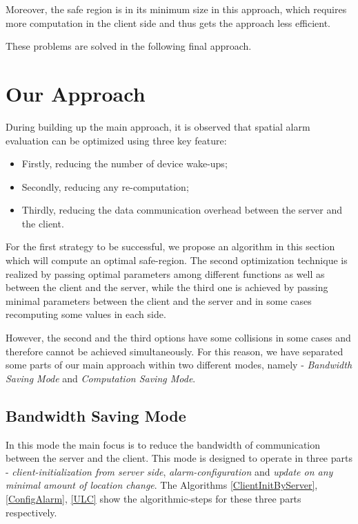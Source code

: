 \documentclass{sig-alternate}
\begin{document}
Moreover, the safe region is in its minimum size in this approach, which requires more computation in the client side and thus gets the approach less efficient.

These problems are solved in the following final approach.

\section{Our Approach}
During building up the main approach, it is observed that spatial alarm evaluation can be optimized using three key feature: 
\begin{itemize}
\setlength\itemsep{0em}
\item Firstly, reducing the number of device wake-ups;
\item Secondly, reducing any re-computation;
\item Thirdly, reducing the data communication overhead between the server and the client.
\end{itemize}

For the first strategy to be successful, we propose an algorithm in this section which will compute an optimal safe-region. The second optimization technique is realized by passing optimal parameters among different functions as well as between the client and the server, while the third one is achieved by passing minimal parameters between the client and the server and in some cases recomputing some values in each side.

However, the second and the third options have some collisions in some cases and therefore cannot be achieved simultaneously. For this reason, we have separated some parts of our main approach within two different modes, namely - \textit{Bandwidth Saving Mode} and \textit{Computation Saving Mode}.

\subsection{Bandwidth Saving Mode}
In this mode the main focus is to reduce the bandwidth of communication between the server and the client. This mode is designed to operate in three parts - \textit{client-initialization from server side}, \textit{alarm-configuration} and \textit{update on any minimal amount of location change}. The Algorithms \ref{ClientInitByServer}, \ref{ConfigAlarm}, \ref{ULC} show the algorithmic-steps for these three parts respectively.\\
\end{document}
